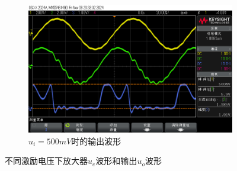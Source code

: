 \documentclass[UTF8]{ctexart}
\begin{document}
\begin{figure}[H]
    \begin{subfigure}[c]{0.45\textwidth}
        \centering
        \includegraphics[width=\textwidth]{pics/53.png}
        \caption{$u_i=500mV$时的输出波形}\label{fig:53}
    \end{subfigure}
    \caption{不同激励电压下放大器$u_e$波形和输出$u_o$波形}\label{fig:5}
\end{figure}
\end{document}
